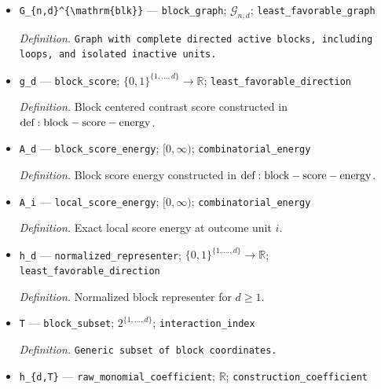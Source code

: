 \documentclass{article}
\begin{document}
\begin{itemize}
  \par\smallskip\noindent\emph{Definition.} Active complete directed block of size \(d\).
  \item \texttt{G\_\allowbreak{}\{n,\allowbreak{}d\}\allowbreak{}\textasciicircum{}\{\textbackslash{}\allowbreak{}mathrm\{blk\}\allowbreak{}\}\allowbreak{}} --- \texttt{block\_\allowbreak{}graph}; \(\mathcal G_{n,d}\); \texttt{least\_\allowbreak{}favorable\_\allowbreak{}graph}
  \par\smallskip\noindent\emph{Definition.} \texttt{Graph with complete directed active blocks,\allowbreak{} including loops,\allowbreak{} and isolated inactive units.}
  \item \texttt{g\_\allowbreak{}d} --- \texttt{block\_\allowbreak{}score}; \(\{0,1\}^{\{1,\ldots,d\}}\to\mathbb R\); \texttt{least\_\allowbreak{}favorable\_\allowbreak{}direction}
  \par\smallskip\noindent\emph{Definition.} Block centered contrast score constructed in \({\rm def:block-score-energy}\).
  \item \texttt{A\_\allowbreak{}d} --- \texttt{block\_\allowbreak{}score\_\allowbreak{}energy}; \([0,\infty)\); \texttt{combinatorial\_\allowbreak{}energy}
  \par\smallskip\noindent\emph{Definition.} Block score energy constructed in \({\rm def:block-score-energy}\).
  \item \texttt{A\_\allowbreak{}i} --- \texttt{local\_\allowbreak{}score\_\allowbreak{}energy}; \([0,\infty)\); \texttt{combinatorial\_\allowbreak{}energy}
  \par\smallskip\noindent\emph{Definition.} Exact local score energy at outcome unit \(i\).
  \item \texttt{h\_\allowbreak{}d} --- \texttt{normalized\_\allowbreak{}representer}; \(\{0,1\}^{\{1,\ldots,d\}}\to\mathbb R\); \texttt{least\_\allowbreak{}favorable\_\allowbreak{}direction}
  \par\smallskip\noindent\emph{Definition.} Normalized block representer for \(d\ge1\).
  \item \texttt{T} --- \texttt{block\_\allowbreak{}subset}; \(2^{\{1,\ldots,d\}}\); \texttt{interaction\_\allowbreak{}index}
  \par\smallskip\noindent\emph{Definition.} \texttt{Generic subset of block coordinates.}
  \item \texttt{h\_\allowbreak{}\{d,\allowbreak{}T\}\allowbreak{}} --- \texttt{raw\_\allowbreak{}monomial\_\allowbreak{}coefficient}; \(\mathbb R\); \texttt{construction\_\allowbreak{}coefficient}

\end{itemize}
\end{document}
